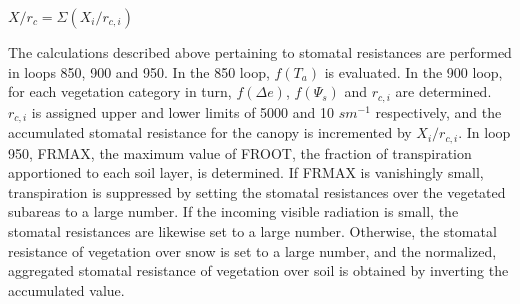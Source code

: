 $X/r_c = \Sigma (X_i / r_{c,i})$

The calculations described above pertaining to stomatal resistances are performed in loops 850, 900 and 950. In the 850 loop, $f(T_a)$ is evaluated. In the 900 loop, for each vegetation category in turn, $f(\Delta e)$, $f(\Psi_s)$ and $r_{c,i}$ are determined. $r_{c,i}$ is assigned upper and lower limits of 5000 and 10 $s m^{-1}$ respectively, and the accumulated stomatal resistance for the canopy is incremented by $X_i / r_{c,i}$. In loop 950, F\+R\+M\+A\+X, the maximum value of F\+R\+O\+O\+T, the fraction of transpiration apportioned to each soil layer, is determined. If F\+R\+M\+A\+X is vanishingly small, transpiration is suppressed by setting the stomatal resistances over the vegetated subareas to a large number. If the incoming visible radiation is small, the stomatal resistances are likewise set to a large number. Otherwise, the stomatal resistance of vegetation over snow is set to a large number, and the normalized, aggregated stomatal resistance of vegetation over soil is obtained by inverting the accumulated value.